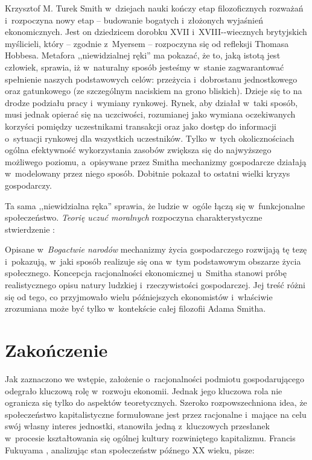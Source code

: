 \begin{artplenv}{Krzysztof M. Turek}
Smith w~dziejach nauki kończy etap filozoficznych rozważań i~rozpoczyna nowy etap -- budowanie bogatych i~złożonych
wyjaśnień ekonomicznych. Jest on dziedzicem dorobku XVII i~XVIII-\mbox{-wiecznych} brytyjskich myślicieli,
który -- zgodnie z~Myersem -- rozpoczyna się od refleksji Thomasa Hobbesa. Metafora ,,niewidzialnej ręki''
ma pokazać, że to, jaką istotą
jest człowiek, sprawia, iż w~naturalny sposób jesteśmy w~stanie zagwarantować spełnienie naszych podstawowych celów:
przeżycia i~dobrostanu jednostkowego oraz gatunkowego (ze szczególnym naciskiem na grono bliskich). Dzieje się to na
drodze podziału pracy i~wymiany rynkowej. Rynek, aby działał w~taki sposób, musi jednak opierać się na uczciwości,
rozumianej jako wymiana oczekiwanych korzyści pomiędzy uczestnikami transakcji oraz jako dostęp do
informacji o~sytuacji rynkowej dla wszystkich uczestników. Tylko w~tych okolicznościach ogólna efektywność wykorzystania zasobów
zwiększa się do najwyższego możliwego poziomu, a~opisywane przez Smitha mechanizmy gospodarcze działają w~modelowany
przez niego sposób. Dobitnie pokazał to ostatni wielki kryzys gospodarczy.

Ta sama ,,niewidzialna ręka'' sprawia, że ludzie w~ogóle łączą się w~funkcjonalne społeczeństwo. \textit{Teorię uczuć
moralnych} rozpoczyna charakterystyczne stwierdzenie
\parencite[s.~5]{smith_teoria_1989}:


Opisane w~\textit{Bogactwie narodów} mechanizmy życia gospodarczego rozwijają tę tezę
i~pokazują, w~jaki sposób realizuje się ona w~tym podstawowym obszarze życia społecznego. Koncepcja racjonalności
ekonomicznej u~Smitha stanowi próbę realistycznego opisu natury ludzkiej i~rzeczywistości gospodarczej. Jej treść różni
się od tego, co przyjmowało wielu późniejszych ekonomistów i~właściwie zrozumiana może być tylko w~kontekście całej
filozofii Adama Smitha.

\section*{Zakończenie}

Jak zaznaczono we wstępie, założenie o~racjonalności podmiotu gospodarującego odegrało kluczową
rolę w~rozwoju ekonomii. Jednak jego kluczowa rola nie ogranicza się tylko do aspektów teoretycznych.
Szeroko rozpowszechniona
idea, że społeczeństwo kapitalistyczne formułowane jest przez racjonalne i~mające na celu swój własny interes
jednostki, stanowiła jedną z~kluczowych przesłanek w~procesie kształtowania się ogólnej kultury rozwiniętego
kapitalizmu. Francis Fukuyama
\parencite*[s.~4]{fukuyama_end_1989},
analizując
stan społeczeństw późnego XX wieku, pisze: 


\end{artplenv}
